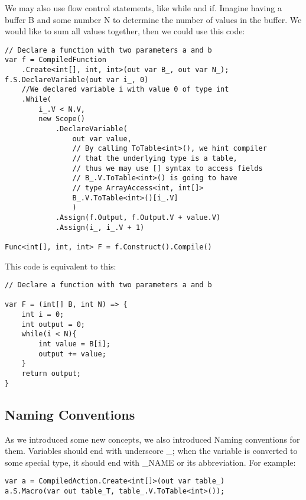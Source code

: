 We may also use flow control statements, like while and if. Imagine having a buffer B and some number N to determine the number of values in the buffer.  We would like to sum all values together, then we could use this code:
\begin{lstlisting}
// Declare a function with two parameters a and b
var f = CompiledFunction
    .Create<int[], int, int>(out var B_, out var N_);
f.S.DeclareVariable(out var i_, 0)
    //We declared variable i with value 0 of type int
    .While(
        i_.V < N.V, 
        new Scope()
            .DeclareVariable(
                out var value,
                // By calling ToTable<int>(), we hint compiler
                // that the underlying type is a table,
                // thus we may use [] syntax to access fields
                // B_.V.ToTable<int>() is going to have 
                // type ArrayAccess<int, int[]> 
                B_.V.ToTable<int>()[i_.V]
                )
            .Assign(f.Output, f.Output.V + value.V)
            .Assign(i_, i_.V + 1)

Func<int[], int, int> F = f.Construct().Compile()
\end{lstlisting}
This code is equivalent to this:
\begin{lstlisting}
// Declare a function with two parameters a and b

var F = (int[] B, int N) => {
    int i = 0;
    int output = 0;
    while(i < N){
        int value = B[i];
        output += value;
    }
    return output;
}
\end{lstlisting}
\subsection{Naming Conventions}
As we introduced some new concepts, we also introduced Naming conventions for them. Variables should end with underscore \_; when the variable is converted to some special type, it should end with \_NAME or its abbreviation. For example:
\begin{lstlisting}
var a = CompiledAction.Create<int[]>(out var table_)
a.S.Macro(var out table_T, table_.V.ToTable<int>());
\end{lstlisting}

